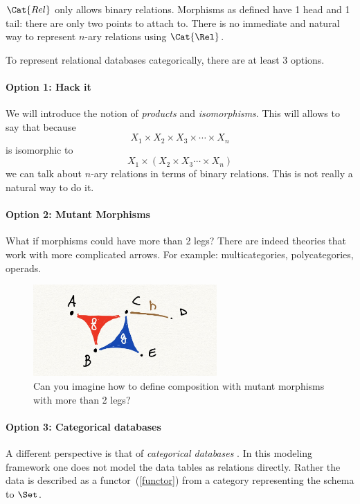 $\Cat{Rel}$ only allows binary relations. Morphisms as defined have 1 head and 1 tail:
there are only two points to attach to. There is no immediate and natural way to represent $n$-ary relations using $\Cat{\Rel}$.

To represent relational databases categorically, there are at least 3 options.

\paragraph{Option 1: Hack it}
 We will introduce the notion of \emph{products} and \emph{isomorphisms}.
    This will allows to say that because 
    $$
    X_1 \times X_2 \times X_3 \times \cdots \times X_n
    $$
    is isomorphic to 
     $$
    X_1 \times ( X_2 \times X_3 \cdots \times X_n)
    $$    
    we can talk about $n$-ary relations in terms of binary relations.
    This is not really a natural way to do it.

\paragraph{Option 2: Mutant Morphisms}
    What if morphisms could have more than 2 legs? There
    are indeed theories that work with more complicated arrows.
    For example: multicategories, polycategories, operads. 
    
\begin{figure}[h]
\centering
\includegraphics[width=7cm]{chapters/mutants.jpg}
\caption{Can you imagine how to define
composition with mutant morphisms
with more than 2 legs?}
\end{figure}
    
\paragraph{Option 3: Categorical databases}

A different perspective is that of \emph{categorical databases} . In this modeling framework
one does not model the data tables as relations directly. 
Rather the data is described as a functor~(\cref{functor})
from a category representing the schema 
to $\Set$. 
